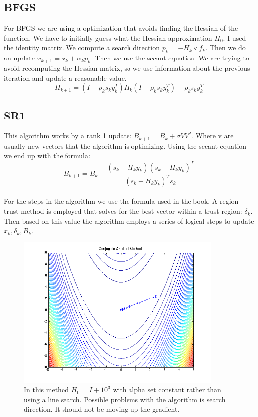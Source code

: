 \documentclass[7pt]{article}
\begin{document}
	\subsection{BFGS}
	For BFGS we are using a optimization that avoids finding the Hessian of the function. We have to initially guess what the Hessian approximation $H_0$. I used the identity matrix. We compute a search direction $p_k=-H_k\triangledown f_k$. Then we do an update $x_{k+1} = x_k + \alpha_k p_k$. Then we use the secant equation. We are trying to avoid recomputing the Hessian matrix, so we use information about the previous iteration and update a reasonable value.
	$$H_{k+1} = (I-\rho_k s_k y_k^T)H_k(I-\rho_k s_k y_k^T)+\rho_k s_k y_k^T $$
	\subsection{SR1}
	This algorithm works by a rank 1 update: $B_{k+1} = B_k +\sigma VV^T$. Where v are usually new vectors that the algorithm is optimizing. Using the secant equation we end up with the formula: 
$$ B_{k+1} = B_k + \frac{(s_k - H_ky_k)(s_k - H_ky_k)^T}{(s_k - H_ky_k)^Ts_k} $$\\ 
For the steps in the algorithm we use the formula used in the book. A region trust method is employed that solves for the best vector within a trust region: $\delta_k$. Then based on this value the algorithm employs a series of logical steps to update  $x_k,\delta_k, B_k$. \\
\pagebreak
\begin{figure}
	\includegraphics[width = 10cm]{conGrad}
	\caption{In this method $H_0= I+10^3$ with alpha set constant rather than using a line search. Possible problems with the algorithm is search direction. It should not be moving up the gradient.}
\end{figure}
\end{document}
